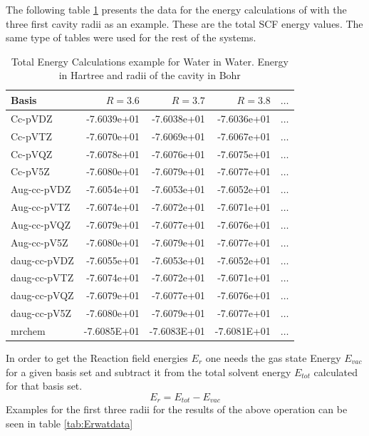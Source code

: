 \documentclass[../master_thesis.tex]{subfiles}
\begin{document}
The following table \ref{tab:rawwaterdata}  presents the data for the energy
calculations of  with the three first cavity radii as an example.
These are the total \ac{SCF} energy values.
The same type of tables were used for the rest of the
systems.
\begin{table}[htbp]
\caption{Total Energy Calculations example for Water in Water. Energy in Hartree and radii of the cavity in Bohr}
\begin{center}
\begin{tabular}{|l|r|r|r|r|}
\hline
Basis & $R =3.6$ & $R=3.7$ & $R=3.8$ & $\ldots$\\  \hline
Cc-pVDZ & -7.6039e+01 & -7.6038e+01 & -7.6036e+01 & $\ldots$\\ \hline
Cc-pVTZ & -7.6070e+01 & -7.6069e+01 & -7.6067e+01 & $\ldots$\\ \hline
Cc-pVQZ & -7.6078e+01 & -7.6076e+01 & -7.6075e+01 & $\ldots$\\ \hline
Cc-pV5Z & -7.6080e+01 & -7.6079e+01 & -7.6077e+01 & $\ldots$\\ \hline
Aug-cc-pVDZ & -7.6054e+01 & -7.6053e+01 & -7.6052e+01 & $\ldots$\\ \hline
Aug-cc-pVTZ & -7.6074e+01 & -7.6072e+01 & -7.6071e+01 & $\ldots$\\ \hline
Aug-cc-pVQZ & -7.6079e+01 & -7.6077e+01 & -7.6076e+01 & $\ldots$\\ \hline
Aug-cc-pV5Z & -7.6080e+01 & -7.6079e+01 & -7.6077e+01 & $\ldots$\\ \hline
daug-cc-pVDZ & -7.6055e+01 & -7.6053e+01 & -7.6052e+01 & $\ldots$\\ \hline
daug-cc-pVTZ & -7.6074e+01 & -7.6072e+01 & -7.6071e+01 & $\ldots$\\ \hline
daug-cc-pVQZ & -7.6079e+01 & -7.6077e+01 & -7.6076e+01 & $\ldots$\\ \hline
daug-cc-pV5Z & -7.6080e+01 & -7.6079e+01 & -7.6077e+01 & $\ldots$\\ \hline
mrchem & -7.6085E+01 & -7.6083E+01 & -7.6081E+01 & $\ldots$\\ \hline
\end{tabular}
\end{center}
\label{tab:rawwaterdata}
\end{table}

In order to get the Reaction field
energies $E_r$ one needs the gas state Energy $E_{vac}$ for a given
basis set and subtract it from the total solvent energy $E_{tot}$ calculated for
that basis set.
\begin{equation}
  E_r = E_{tot} - E_{vac}
\end{equation}
Examples for the first three radii for the results of the above operation can be
seen in table \ref{tab:Erwatdata}
\end{document}
